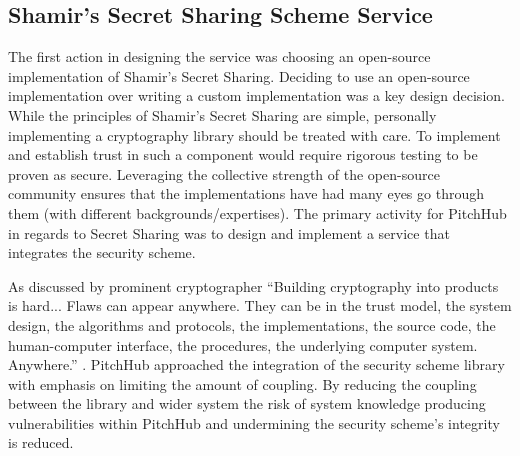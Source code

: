 \subsection{Shamir's Secret Sharing Scheme Service}\label{SS:design_shamir_secret_sharing_service}
The first action in designing the service was choosing an open-source implementation of Shamir's Secret Sharing. Deciding to use an open-source implementation over writing a custom implementation was a key design decision. While the principles of Shamir's Secret Sharing are simple, personally implementing a cryptography library should be treated with care. To implement and establish trust in such a component would require rigorous testing to be proven as secure. Leveraging the collective strength of the open-source community ensures that the implementations have had many eyes go through them (with different backgrounds/expertises). The primary activity for PitchHub in regards to Secret Sharing was to design and implement a service that integrates the security scheme.
\par
As discussed by prominent cryptographer \citeauthor{schneier1999cryptography} ``Building cryptography into products is hard... Flaws can appear anywhere. They can be in the trust model, the system design, the algorithms and protocols, the implementations, the source code, the human-computer interface, the procedures, the underlying computer system. Anywhere.'' \cite{schneier1999cryptography}. PitchHub approached the integration of the security scheme library with emphasis on limiting the amount of coupling. By reducing the coupling between the library and wider system the risk of system knowledge producing vulnerabilities within PitchHub and undermining the security scheme's integrity is reduced.
\par

